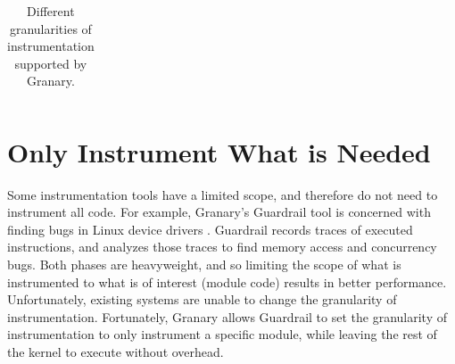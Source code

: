 \documentclass[preprint]{sigplanconf}
\newcommand{\toolname}[1]{{\scshape #1}}
\begin{document}
\begin{table}[ht!]
\begin{tabularx}{\linewidth}{| l | >{\raggedright}p{0.3\linewidth} | X |}
\hline
\end{tabularx}
\caption{\label{tab:granularities}Different granularities of instrumentation supported by Granary.}
\end{table}

\section{Only Instrument What is Needed}\label{sec:what}

Some instrumentation tools have a limited scope, and therefore do not need to instrument all code. For example, Granary's Guardrail tool is concerned with finding bugs in Linux device drivers \cite{Guardrail}. Guardrail records traces of executed instructions, and analyzes those traces to find memory access and concurrency bugs. Both phases are heavyweight, and so limiting the scope of what is instrumented to what is of interest (module code) results in better performance. Unfortunately, existing systems are unable to change the granularity of instrumentation. Fortunately, Granary allows Guardrail to set the granularity of instrumentation to only instrument a specific module, while leaving the rest of the kernel to execute without overhead.





\end{document}
